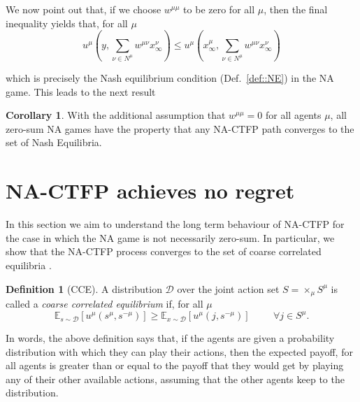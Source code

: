 \documentclass{article}
\theoremstyle{definition}
\newtheorem{definition}{Definition}
\newtheorem{corollary}{Corollary}
\newcommand{\wmunu}{w^{\mu \nu}}
\newcommand{\xmu}{x^{\mu}}
\newcommand{\xnu}{x^{\nu}}
\begin{document}
  We now point out that, if we choose $w^{\mu \mu}$ to be zero for all $\mu$, then the final inequality yields that, for all $\mu$
%
  \begin{equation} 
    u^\mu(y, \sum_{\nu \in N^\mu} \wmunu \xnu_\infty) \leq u^\mu(\xmu_\infty, \sum_{\nu \in N^\mu} \wmunu \xnu_\infty)
  \end{equation}

  which is precisely the Nash equilibrium condition (Def.~\ref{def::NE}) in the NA game. This leads to the next result
%
  \begin{corollary} \label{thm::NACTFPtoNE}
    With the additional assumption that $w^{\mu \mu} = 0$ for all agents $\mu$, all zero-sum NA games have the property that any NA-CTFP path converges to the set of Nash Equilibria.
  \end{corollary}

\section{NA-CTFP achieves no regret}
  \label{sec::CCEConvergence}

  In this section we aim to understand the long term behaviour of NA-CTFP for the
  case in which the NA game is not necessarily zero-sum. In
  particular, we show that the NA-CTFP process converges to the set of
  coarse correlated equilibria \cite{Nisan2007}.
  \begin{definition}[CCE]
    A distribution $\mathcal{D}$ over the joint action set $S =
    \times_\mu S^\mu$ is called a \emph{coarse correlated equilibrium}
     if, for all $\mu$
    \begin{equation}
      \mathbb{E}_{s \sim \mathcal{D}}[u^\mu (s^\mu, s^{- \mu})] \geq
      \mathbb{E}_{x \sim \mathcal{D}}[u^\mu (j, s^{-
          \mu})] \hspace{1cm} \forall j \in S^\mu.
    \end{equation}
  \end{definition}

  In words, the above definition says that, if the agents are given a
  probability distribution with which they can play their actions, then
  the expected payoff, for all agents is greater than or equal to the
  payoff that they would get by playing any of their other available
  actions, assuming that the other agents keep to the distribution.
  
\end{document}
